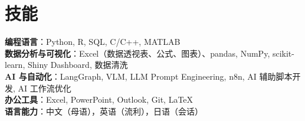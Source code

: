 \documentclass[UTF8,a4paper,10pt]{ctexart}
\begin{document}
\section{技能}
\vspace{2pt}
\small
\textbf{编程语言}：Python, R, SQL, C/C++, MATLAB \\
\textbf{数据分析与可视化}：Excel（数据透视表、公式、图表）、pandas, NumPy, scikit-learn, Shiny Dashboard, 数据清洗 \\
\textbf{AI 与自动化}：LangGraph, VLM, LLM Prompt Engineering, n8n, AI 辅助脚本开发, AI 工作流优化 \\
\textbf{办公工具}：Excel, PowerPoint, Outlook, Git, LaTeX \\
\textbf{语言能力}：中文（母语），英语（流利），日语（会话）
\end{document}
